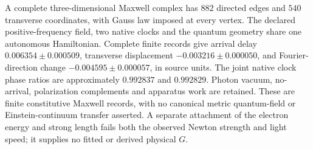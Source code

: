 A complete three-dimensional Maxwell complex has $882$ directed edges and
$540$ transverse coordinates, with Gauss law imposed at every vertex.
The declared positive-frequency field, two native clocks and the quantum
geometry share one autonomous Hamiltonian. Complete finite records give
arrival delay $0.006354\pm0.000509$, transverse displacement
$-0.003216\pm0.000050$, and Fourier-direction change
$-0.004595\pm0.000057$, in source units. The joint native clock phase ratios
are approximately $0.992837$ and $0.992829$. Photon vacuum, no-arrival,
polarization complements and apparatus work are retained. These are finite
constitutive Maxwell records, with no canonical metric quantum-field or
Einstein-continuum transfer asserted. A separate attachment of the electron
energy and strong length fails both the observed Newton strength and light
speed; it supplies no fitted or derived physical $G$.
